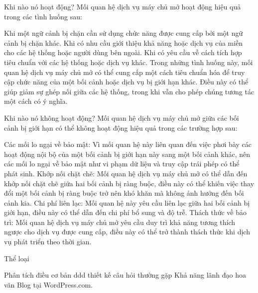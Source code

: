 Khi nào nó hoạt động?
Mối quan hệ dịch vụ máy chủ mở hoạt động hiệu quả trong các tình huống sau:

Khi một ngữ cảnh bị chặn cần sử dụng chức năng được cung cấp bởi một ngữ cảnh bị chặn khác.
Khi có nhu cầu giới thiệu khả năng hoặc dịch vụ của miền cho các hệ thống hoặc người dùng bên ngoài.
Khi có yêu cầu về cách tích hợp tiêu chuẩn với các hệ thống hoặc dịch vụ khác.
Trong những tình huống này, mối quan hệ dịch vụ máy chủ mở có thể cung cấp một cách tiêu chuẩn hóa để truy cập chức năng của một bối cảnh hoặc dịch vụ bị giới hạn khác. Điều này có thể giúp giảm sự ghép nối giữa các hệ thống, trong khi vẫn cho phép chúng tương tác một cách có ý nghĩa.

Khi nào nó không hoạt động?
Mối quan hệ dịch vụ máy chủ mở giữa các bối cảnh bị giới hạn có thể không hoạt động hiệu quả trong các trường hợp sau:

Các mối lo ngại về bảo mật: Vì mối quan hệ này liên quan đến việc phơi bày các hoạt động nội bộ của một bối cảnh bị giới hạn này sang một bối cảnh khác, nên các mối lo ngại về bảo mật như vi phạm dữ liệu và truy cập trái phép có thể phát sinh.
Khớp nối chặt chẽ: Mối quan hệ dịch vụ máy chủ mở có thể dẫn đến khớp nối chặt chẽ giữa hai bối cảnh bị ràng buộc, điều này có thể khiến việc thay đổi một bối cảnh bị ràng buộc trở nên khó khăn mà không ảnh hưởng đến bối cảnh kia.
Chi phí liên lạc: Mối quan hệ này yêu cầu liên lạc giữa hai bối cảnh bị giới hạn, điều này có thể dẫn đến chi phí bổ sung và độ trễ.
Thách thức về bảo trì: Mối quan hệ dịch vụ máy chủ mở yêu cầu duy trì khả năng tương thích ngược cho dịch vụ được cung cấp, điều này có thể trở thành thách thức khi dịch vụ phát triển theo thời gian. 


Thể loại

Phân tích
điều cơ bản
ddd
thiết kế
câu hỏi thường gặp
Khả năng lãnh đạo
hoa văn
Blog tại WordPress.com.

